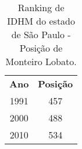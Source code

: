 \begin{table}[htbp]
	\centering
	\caption{Ranking de IDHM do estado de São Paulo - Posição de Monteiro Lobato.}
\begin{tabular}{c|c}
	\rowcolor[rgb]{ .969,  .588,  .275} \textcolor[rgb]{ 1,  1,  1}{\textbf{Ano}} & \textcolor[rgb]{ 1,  1,  1}{\textbf{Posição }} \\
	\rowcolor[rgb]{ .984,  .831,  .706} 1991  & \multicolumn{1}{c|}{457} \\
	\rowcolor[rgb]{ .992,  .914,  .851} 2000  & \multicolumn{1}{c|}{488} \\
	\rowcolor[rgb]{ .984,  .831,  .706} 2010  & 534 \\
\end{tabular}%

	\label{tab:idhm}%
\end{table}%

